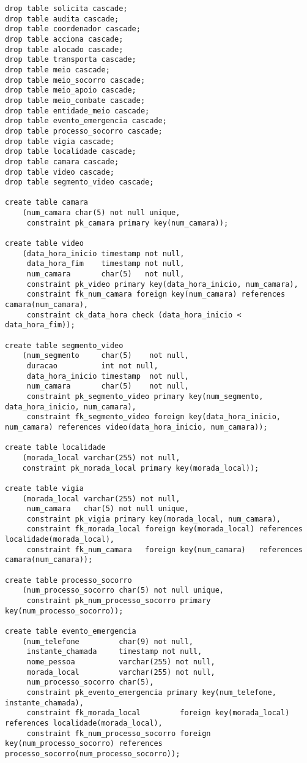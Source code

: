 \documentclass[12pt,a4paper]{article}
\begin{document}
\begin{verbatim}
drop table solicita cascade;
drop table audita cascade;
drop table coordenador cascade;
drop table acciona cascade;
drop table alocado cascade;
drop table transporta cascade;
drop table meio cascade;
drop table meio_socorro cascade;
drop table meio_apoio cascade;
drop table meio_combate cascade;
drop table entidade_meio cascade;
drop table evento_emergencia cascade;
drop table processo_socorro cascade;
drop table vigia cascade;
drop table localidade cascade;
drop table camara cascade;
drop table video cascade;
drop table segmento_video cascade;

create table camara 
    (num_camara char(5) not null unique,
     constraint pk_camara primary key(num_camara));

create table video
    (data_hora_inicio timestamp not null,
     data_hora_fim    timestamp not null,
     num_camara       char(5)   not null,
     constraint pk_video primary key(data_hora_inicio, num_camara),
     constraint fk_num_camara foreign key(num_camara) references camara(num_camara),
     constraint ck_data_hora check (data_hora_inicio < data_hora_fim));

create table segmento_video
    (num_segmento     char(5)    not null,
     duracao          int not null,
     data_hora_inicio timestamp  not null,
     num_camara       char(5)    not null,
     constraint pk_segmento_video primary key(num_segmento, data_hora_inicio, num_camara),
     constraint fk_segmento_video foreign key(data_hora_inicio, num_camara) references video(data_hora_inicio, num_camara));

create table localidade
    (morada_local varchar(255) not null,
    constraint pk_morada_local primary key(morada_local));

create table vigia
    (morada_local varchar(255) not null,
     num_camara   char(5) not null unique,
     constraint pk_vigia primary key(morada_local, num_camara),
     constraint fk_morada_local foreign key(morada_local) references localidade(morada_local),
     constraint fk_num_camara   foreign key(num_camara)   references camara(num_camara));

create table processo_socorro
    (num_processo_socorro char(5) not null unique,
     constraint pk_num_processo_socorro primary key(num_processo_socorro));

create table evento_emergencia
    (num_telefone         char(9) not null,
     instante_chamada     timestamp not null,
     nome_pessoa          varchar(255) not null,
     morada_local         varchar(255) not null,
     num_processo_socorro char(5),
     constraint pk_evento_emergencia primary key(num_telefone, instante_chamada),
     constraint fk_morada_local         foreign key(morada_local)         references localidade(morada_local),
     constraint fk_num_processo_socorro foreign key(num_processo_socorro) references processo_socorro(num_processo_socorro));


\end{verbatim}
\end{document}
